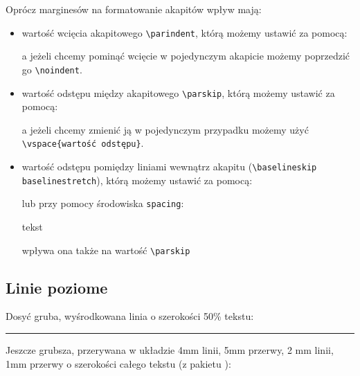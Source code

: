 \documentclass[fontSize=10pt,extra]{pdfArticle}
\begin{document}
Oprócz marginesów na formatowanie akapitów wpływ mają:
\begin{itemize}
\item wartość wcięcia akapitowego \Verb$\parindent$, którą możemy ustawić za pomocą:
\begin{MintedCode}
\setlength{\parindent}{0pt} %
\end{MintedCode}
a jeżeli chcemy pominąć wcięcie w pojedynczym akapicie możemy poprzedzić go \Verb$\noindent$.

\item wartość odstępu między akapitowego \Verb$\parskip$, którą możemy ustawić za pomocą:
\begin{MintedCode}
\setlength{\parindent}{\parskip}{5pt} %
\end{MintedCode}
a jeżeli chcemy zmienić ją w pojedynczym przypadku możemy użyć \Verb$\vspace{wartość odstępu}$.

\item wartość odstępu pomiędzy liniami wewnątrz akapitu (\Verb$\baselineskip$ \Verb$baselinestretch$), którą możemy ustawić za pomocą:
\begin{MintedCode}
\end{MintedCode}
lub przy pomocy środowiska \Verb$spacing$:
\begin{MintedCode}
\begin{spacing}{2.1} tekst \end{spacing}
\end{MintedCode}
wpływa ona także na wartość \Verb$\parskip$
\end{itemize}


\subsection{Linie poziome}
Dosyć gruba, wyśrodkowana linia o szerokości 50\% tekstu:
\begin{Example}
\hfil\rule{0.5\linewidth}{1pt}\hfill
\end{Example}

Jeszcze grubsza, przerywana w układzie 4mm linii, 5mm przerwy, 2 mm linii, 1mm przerwy o szerokości całego tekstu (z pakietu ):
\begin{Example}
\hdashrule{\linewidth}{2pt}{4mm 5mm 2mm 1mm}
\end{Example}
\end{document}
